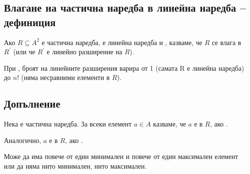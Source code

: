 \subsection{Влагане на частична наредба в линейна наредба – дефиниция}
Ако \(R \subseteq A^2\) е частична наредба,  е линейна наредба и 
, казваме, че \(R\) се влага в \(R^{'}\) (или че \(R^{'}\) е линейно 
разширение на \(R\)).

При , броят на линейните разширения варира от 1 (самата R е линейна наредба) 
до \(n!\) (няма несравними елементи в \(R\)).

\subsection{Допълнение}
Нека  е частична наредба. За всеки елемент \(a \in A\) казваме, че \(a\) е 
 в \(R\), ако .

Аналогично, \(a\) е  в \(R\), ако .

Може да има повече от един минимален и повече от един максимален елемент или да няма нито минимален, нито 
максимален.